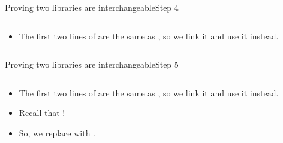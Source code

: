 \documentclass[aspectratio=169, lualatex, handout]{beamer}
\begin{document}
\begin{frame}{Proving two libraries are interchangeable}{Step 4}
	\begin{columns}[c]
		\begin{column}{0.5\textwidth}
			\begin{itemize}
				\item The first two lines of  are the same as , so we link it and use it instead.
			\end{itemize}
		\end{column}
		\begin{column}{0.5\textwidth}
			\begin{center}
			\end{center}
		\end{column}
	\end{columns}
\end{frame}

\begin{frame}{Proving two libraries are interchangeable}{Step 5}
	\begin{columns}[c]
		\begin{column}{0.5\textwidth}
			\begin{itemize}
				\item The first two lines of  are the same as , so we link it and use it instead.
				\item Recall that  \interchangeable{} !
				\item So, we replace  with .
			\end{itemize}
		\end{column}
		\begin{column}{0.5\textwidth}
			\begin{center}
			\end{center}
		\end{column}
	\end{columns}
\end{frame}
\end{document}
